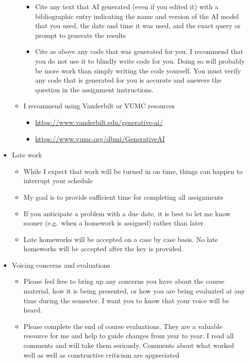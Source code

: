 \documentclass[
  letterpaper,
  DIV=11,
  numbers=noendperiod]{scrartcl}
\begin{document}
\begin{itemize}
\begin{itemize}
    \begin{itemize}
    \item
      Cite any text that AI generated (even if you edited it) with a
      bibliographic entry indicating the name and version of the AI
      model that you used, the date and time it was used, and the exact
      query or prompt to generate the results
    \item
      Cite as above any code that was generated for you. I recommend
      that you do not use it to blindly write code for you. Doing so
      will probably be more work than simply writing the code yourself.
      You must verify any code that is generated for you is accurate and
      answers the question in the assignment instructions.
    \end{itemize}
  \item
    I recommend using Vanderbilt or VUMC resources

    \begin{itemize}
    \item
      \url{https://www.vanderbilt.edu/generative-ai/}
    \item
      \url{https://www.vumc.org/dbmi/GenerativeAI}
    \end{itemize}
  \end{itemize}
\item
  Late work

  \begin{itemize}
  \item
    While I expect that work will be turned in on time, things can
    happen to interrupt your schedule
  \item
    My goal is to provide sufficient time for completing all assignments
  \item
    If you anticipate a problem with a due date, it is best to let me
    know sooner (e.g.~when a homework is assigned) rather than later
  \item
    Late homeworks will be accepted on a case by case basis. No late
    homeworks will be accepted after the key is provided.
  \end{itemize}
\item
  Voicing concerns and evaluations

  \begin{itemize}
  \item
    Please feel free to bring up any concerns you have about the course
    material, how it is being presented, or how you are being evaluated
    at any time during the semester. I want you to know that your voice
    will be heard.
  \item
    Please complete the end of course evaluations. They are a valuable
    resource for me and help to guide changes from year to year. I read
    all comments and will take them seriously. Comments about what
    worked well as well as constructive criticism are appreciated
  \end{itemize}
\end{itemize}
\end{document}
